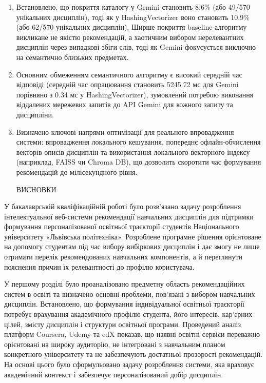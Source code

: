 \documentclass[
]{article}
\begin{document}
\begin{enumerate}
\def\labelenumi{\arabic{enumi}.}
\setcounter{enumi}{34}
\item
  Встановлено, що покриття каталогу у Gemini становить 8.6\% (або 49/570
  унікальних дисциплін), тоді як у HashingVectorizer воно становить
  10.9\% (або 62/570 унікальних дисциплін). Ширше покриття
  baseline-алгоритму викликане не якістю рекомендацій, а хаотичним
  вибором нерелевантних дисциплін через випадкові збіги слів, тоді як
  Gemini фокусується виключно на семантично близьких предметах.
\item
  Основним обмеженням семантичного алгоритму є високий середній час
  відповіді (середній час опрацювання становить 5245.72 мс для Gemini
  порівняно з 0.34 мс у HashingVectorizer), зумовлений потребою
  виконання віддалених мережевих запитів до API Gemini для кожного
  запиту та дисципліни.
\item
  Визначено ключові напрями оптимізації для реального впровадження
  системи: впровадження локального кешування, попереднє
  офлайн-обчислення векторів описів дисциплін та використання локального
  векторного індексу (наприклад, FAISS чи Chroma DB), що дозволить
  скоротити час формування рекомендацій до мілісекундного рівня.

  \protect{}\label{_Toc230434113}{}ВИСНОВКИ
\end{enumerate}

У бакалаврській кваліфікаційній роботі було розв'язано задачу
розроблення інтелектуальної веб-системи рекомендації навчальних
дисциплін для підтримки формування персоналізованої освітньої траєкторії
студентів Національного університету «Львівська політехніка». Розроблене
програмне рішення орієнтоване на допомогу студентам під час вибору
вибіркових дисциплін і дає змогу не лише отримати перелік рекомендованих
навчальних компонентів, а й переглянути пояснення причин їх
релевантності до профілю користувача.

У першому розділі було проаналізовано предметну область рекомендаційних
систем в освіті та визначено основні проблеми, пов'язані з вибором
навчальних дисциплін. Встановлено, що формування індивідуальної
освітньої траєкторії потребує врахування академічного профілю студента,
його інтересів, кар'єрних цілей, змісту дисциплін і структури освітньої
програми. Проведений аналіз платформ Coursera, Udemy та edX показав, що
наявні освітні сервіси переважно орієнтовані на широку аудиторію, не
інтегровані з навчальним планом конкретного університету та не
забезпечують достатньої прозорості рекомендацій. На основі цього було
сформульовано задачу розроблення системи, яка враховує академічний
контекст і забезпечує персоналізований добір дисциплін.
\end{document}
